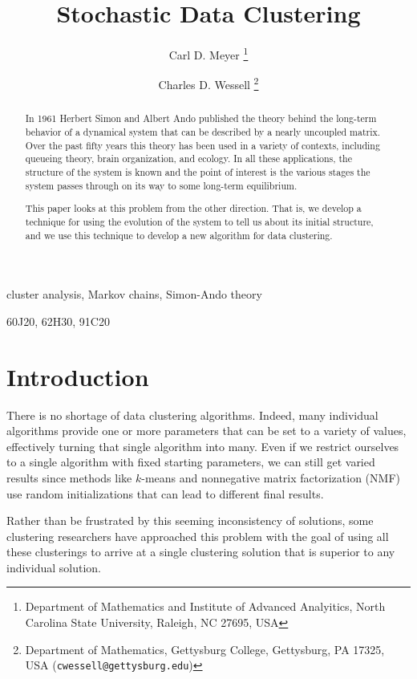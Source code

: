 \documentclass[final]{siamltex}
\title{Stochastic Data Clustering 
         }
\author{Carl D. Meyer \thanks{Department of Mathematics and Institute of Advanced Analyitics, North Carolina State University, Raleigh, NC 27695, USA}
\and Charles D. Wessell \thanks{Department of Mathematics, Gettysburg College, Gettysburg, PA 17325, USA (\texttt{cwessell@gettysburg.edu})}}
\begin{document}
\maketitle

\begin{abstract}
In 1961 Herbert Simon and Albert Ando published the theory behind the long-term behavior of  a dynamical system that can be described by a nearly uncoupled matrix. Over the past fifty years this theory has been used in a variety of contexts, including queueing theory, brain organization, and ecology. In all these applications, the structure of the system is known and the point of interest is the various stages the system passes through on its way to some long-term equilibrium.

This paper looks at this problem from the other direction. That is, we develop a technique for using  the evolution of the system to tell us about its initial structure, and we use this technique to develop a new algorithm for data clustering.
\end{abstract}

\begin{keywords} 
cluster analysis, Markov chains, Simon-Ando theory
\end{keywords}

\begin{AMS}
60J20, 62H30, 91C20
\end{AMS}

\pagestyle{myheadings}
\thispagestyle{plain}

\section{Introduction} \label{sec:intro}
There is no shortage of data clustering algorithms. Indeed, many individual algorithms provide one or more parameters that can be set to a variety of values, effectively turning that single algorithm into many. Even if we restrict ourselves to a single algorithm with fixed starting parameters, we can still get varied results since methods like $k$-means and nonnegative matrix factorization (NMF) use random initializations that can lead to different final results. 

Rather than be frustrated by this seeming inconsistency of solutions, some clustering researchers have approached this problem with the goal of using all these clusterings to arrive at a single clustering solution that is superior to any individual solution.
\end{document}
